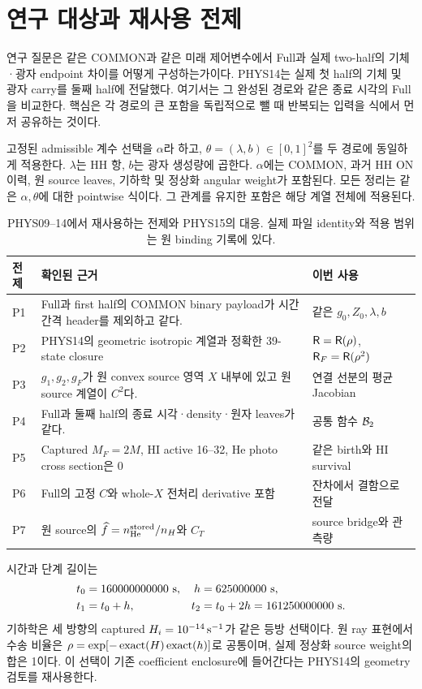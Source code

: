 \section{연구 대상과 재사용 전제}\label{sec:scope}
연구 질문은 같은 COMMON과 같은 미래 제어변수에서 Full과 실제 two-half의 기체·광자 endpoint 차이를 어떻게 구성하는가이다. PHYS14는 실제 첫 half의 기체 및 광자 carry를 둘째 half에 전달했다. 여기서는 그 완성된 경로와 같은 종료 시각의 Full을 비교한다. 핵심은 각 경로의 큰 포함을 독립적으로 뺄 때 반복되는 입력을 식에서 먼저 공유하는 것이다.

고정된 admissible 계수 선택을 $\alpha$라 하고, $\theta=(\lambda,b)\in[0,1]^2$를 두 경로에 동일하게 적용한다. $\lambda$는 HH 항, $b$는 광자 생성량에 곱한다. $\alpha$에는 COMMON, 과거 HH ON 이력, 원 source leaves, 기하학 및 정상화 angular weight가 포함된다. 모든 정리는 같은 $\alpha,\theta$에 대한 pointwise 식이다. 그 관계를 유지한 포함은 해당 계열 전체에 적용된다.

\begin{table}[H]
\centering\small
\begin{tabularx}{\textwidth}{@{}p{11mm}X p{49mm}@{}}
\toprule
전제 & 확인된 근거 & 이번 사용\\
\midrule
P1 & Full과 first half의 COMMON binary payload가 시간 간격 header를 제외하고 같다. & 같은 $g_0,Z_0,\lambda,b$\\
P2 & PHYS14의 geometric isotropic 계열과 정확한 39-state closure & $\mathsf R=\mathsf R(\rho)$, $\mathsf R_F=\mathsf R(\rho^2)$\\
P3 & $g_1,g_2,g_F$가 원 convex source 영역 $X$ 내부에 있고 원 source 계열이 $C^2$다. & 연결 선분의 평균 Jacobian\\
P4 & Full과 둘째 half의 종료 시각·density·원자 leaves가 같다. & 공통 함수 $\mathcal B_2$\\
P5 & Captured $M_F=2M$, HI active 16--32, He photo cross section은 0 & 같은 birth와 HI survival\\
P6 & Full의 고정 $C$와 whole-$X$ 전처리 derivative 포함 & 잔차에서 결함으로 전달\\
P7 & 원 source의 $\widehat f=n_{\rm He}^{\rm stored}/n_H$와 $C_T$ & source bridge와 관측량\\
\bottomrule
\end{tabularx}
\caption{PHYS09--14에서 재사용하는 전제와 PHYS15의 대응. 실제 파일 identity와 적용 범위는 원 binding 기록에 있다.}
\label{tab:premises}
\end{table}

시간과 단계 길이는
\begin{align}
t_0&=160000000000\ {\rm s},&
h&=625000000\ {\rm s},\label{eq:time}\\
t_1&=t_0+h,&
t_2&=t_0+2h=161250000000\ {\rm s}.
\end{align}
기하학은 세 방향의 captured $H_i=10^{-14}\,{\rm s}^{-1}$가 같은 등방 선택이다. 원 ray 표현에서 수송 비율은 $\rho=\exp[-\operatorname{exact}(H)\operatorname{exact}(h)]$로 공통이며, 실제 정상화 source weight의 합은 1이다. 이 선택이 기존 coefficient enclosure에 들어간다는 PHYS14의 geometry 검토를 재사용한다.\cite{phys14,bindings}

